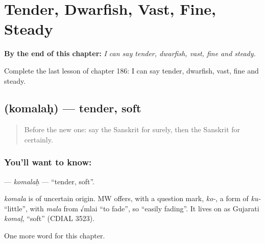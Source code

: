 
\chapter{Tender, Dwarfish, Vast, Fine, Steady}
\label{ch:sa-tender-dwarfish-vast-fine-steady}

\begin{chapteropening}
\textbf{By the end of this chapter:} \emph{I can say tender, dwarfish, vast, fine and steady.}

Complete the last lesson of chapter 186: I can say tender, dwarfish, vast, fine and steady.
\end{chapteropening}

\section[\texorpdfstring{\sk{कोमलः} (komalaḥ)}{कोमलः (komalaḥ)}]{ (komalaḥ) — tender, soft}

\label{lesson:SA-C186-komalah}



\begin{quote}
Before the new one: say the Sanskrit for surely, then the Sanskrit for certainly.
\end{quote}

\subsection*{You'll want to know: }
\textbf{} — \emph{komalaḥ} — \textquotedblleft{}tender, soft\textquotedblright{}.

\begin{cousinweb}
\emph{komala} is of uncertain origin. MW offers, with a question mark, \emph{ko-}, a form of \emph{ku-} \textquotedblleft{}little\textquotedblright{}, with \emph{mala} from √mlai \textquotedblleft{}to fade\textquotedblright{}, so \textquotedblleft{}easily fading\textquotedblright{}. It lives on as Gujarati \emph{komaḷ}, \textquotedblleft{}soft\textquotedblright{} (CDIAL 3523).
\end{cousinweb}

\begin{grammarlens}[title={What you've built}]
One more word for this chapter.
\end{grammarlens}

